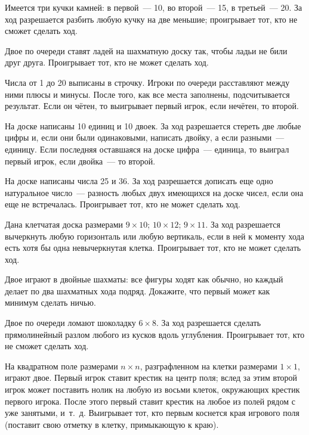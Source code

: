 \begin{problems}

\item
Имеется три кучки камней: в первой~--- 10, во второй~--- 15, в третьей~--- 20.
За ход разрешается разбить любую кучку на две меньшие;
проигрывает тот, кто не сможет сделать ход.

\item
Двое по очереди ставят ладей на шахматную доску так, чтобы ладьи не били друг
друга.
Проигрывает тот, кто не может сделать ход.

\item
Числа от 1 до 20 выписаны в строчку.
Игроки по очереди расставляют между ними плюсы и минусы.
После того, как все места заполнены, подсчитывается результат.
Если он чётен, то выигрывает первый игрок, если нечётен, то второй.

\item
На доске написаны 10 единиц и 10 двоек.
За ход разрешается стереть две любые цифры и, если они были одинаковыми,
написать двойку, а если разными~--- единицу.
Если последняя оставшаяся на доске цифра~--- единица, то выиграл первый игрок,
если двойка~--- то второй.

\item
На доске написаны числа 25 и 36.
За ход разрешается дописать еще одно натуральное число~--- разность любых двух
имеющихся на доске чисел, если она еще не встречалась.
Проигрывает тот, кто не может сделать ход.

\item
Дана клетчатая доска размерами
\quad
\sbp $9 \times 10$;
\quad
\sbp $10 \times 12$;
\quad
\sbp $9 \times 11$.
\quad
За ход разрешается вычеркнуть любую горизонталь или любую вертикаль, если в ней
к моменту хода есть хотя бы одна невычеркнутая клетка.
Проигрывает тот, кто не может сделать ход.

\item
Двое играют в двойные шахматы:
все фигуры ходят как обычно, но каждый делает по два шахматных хода подряд.
Докажите, что первый может как минимум сделать ничью.

\item
Двое по очереди ломают шоколадку $6 \times 8$.
За ход разрешается сделать прямолинейный разлом любого из кусков вдоль
углубления.
Проигрывает тот, кто не сможет сделать ход.

\item
На квадратном поле размерами $n \times n$, разграфленном на клетки размерами
$1 \times 1$, играют двое.
Первый игрок ставит крестик на центр поля;
вслед за этим второй игрок может поставить нолик на любую из восьми клеток,
окружающих крестик первого игрока.
После этого первый ставит крестик на любое из полей рядом с уже занятыми, и~т.~д.
Выигрывает тот, кто первым коснется края игрового поля (поставит свою отметку в
клетку, примыкающую к краю).

\end{problems}

